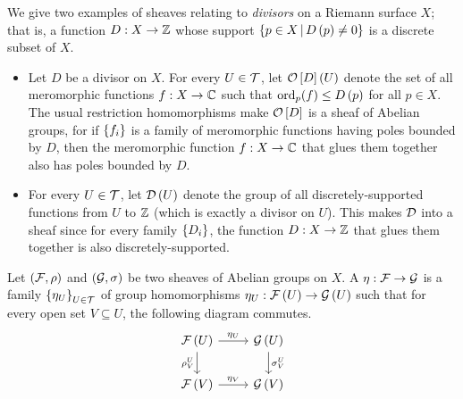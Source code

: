 \documentclass[../Moduli_Spaces_of_Riemann_Surfaces.tex]{subfiles}
\begin{document}
    \begin{example}
        We give two examples of sheaves relating to \textit{divisors} on a Riemann surface $X$; that is, a function $D:X\to\mathbb{Z}$ whose support $\left\{p\in X\,\middle\vert\, D\left(p\right)\neq0\right\}$ is a discrete subset of $X$.
        \begin{itemize}
            \item Let $D$ be a divisor on $X$. For every $U\in\mathcal{T}$, let $\mathcal{O}\left[D\right]\left(U\right)$ denote the set of all meromorphic functions $f:X\to\mathbb{C}$ such that $\operatorname{ord}_p\!\left(f\right)\leq D\left(p\right)$ for all $p\in X$. The usual restriction homomorphisms make $\mathcal{O}\left[D\right]$ is a sheaf of Abelian groups,  for if $\left\{f_i\right\}$ is a family of meromorphic functions having poles bounded by $D$, then the meromorphic function $f:X\to\mathbb{C}$ that glues them together also has poles bounded by $D$.
            \item For every $U\in\mathcal{T}$, let $\mathcal{D}\left(U\right)$ denote the group of all discretely-supported functions from $U$ to $\mathbb{Z}$ (which is exactly a divisor on $U$). This makes $\mathcal{D}$ into a sheaf since for every family $\left\{D_i\right\}$, the function $D:X\to\mathbb{Z}$ that glues them together is also discretely-supported.\exqed
        \end{itemize}
    \end{example}
    \begin{definition}
        Let $\left(\mathcal{F},\rho\right)$ and $\left(\mathcal{G},\sigma\right)$ be two sheaves of Abelian groups on $X$. A   $\eta:\mathcal{F}\to\mathcal{G}$ is a family $\left\{\eta_U\right\}_{U\in\mathcal{T}}$ of group homomorphisms $\eta_U:\mathcal{F}\left(U\right)\to\mathcal{G}\left(U\right)$ such that for every open set $V\subseteq U$, the following diagram commutes.
        \vspace{-0.05in}
        \begin{equation*}
            \begin{tikzcd}
                \mc{F}\l(U\r) \ar[r, "\eta_U"] \ar[d, "\rho^U_V"'] & \mc{G}\l(U\r) \ar[d, "\sigma^U_V"] \\
                \mc{F}\l(V\r) \ar[r, "\eta_V"] & \mc{G}\l(V\r)
            \end{tikzcd}
            \vspace{-0.02in}
        \end{equation*}
    \end{definition}
\end{document}
